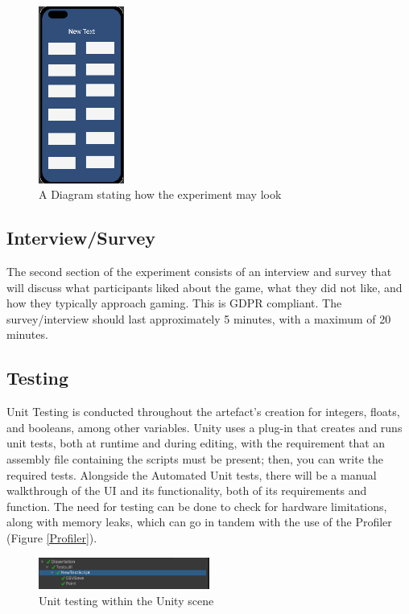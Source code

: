 \documentclass[conference]{IEEEtran}
\begin{document}
\begin{figure}[H]
\begin{center}
\includegraphics[width = 0.25\textwidth, ]{Sim1}
\caption{A Diagram stating how the experiment may look}
\label{figure1}
\end{center}
\end{figure}

\subsection{Interview/Survey}
The second section of the experiment consists of an interview and survey that will discuss what participants liked about the game, what they did not like, and how they typically approach gaming. This is GDPR compliant. The survey/interview should last approximately 5 minutes, with a maximum of 20 minutes.

\subsection{Testing}
Unit Testing is conducted throughout the artefact’s creation for integers, floats, and booleans, among other variables. Unity uses a plug-in that creates and runs unit tests, both at runtime and during editing, with the requirement that an assembly file containing the scripts must be present; then, you can write the required tests. Alongside the Automated Unit tests, there will be a manual walkthrough of the UI and its functionality, both of its requirements and function. The need for testing can be done to check for hardware limitations, along with memory leaks, which can go in tandem with the use of the Profiler (Figure \ref{Profiler}).
\begin{figure}[H]
\begin{center}
\includegraphics[width = 0.5\textwidth, ]{Unittesting}
\caption{Unit testing within the Unity scene}
\label{figure3}
\end{center}
\end{figure}
\end{document}
